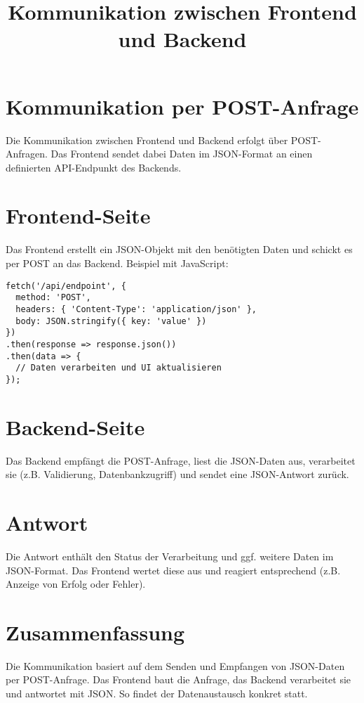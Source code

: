 \documentclass{article}
\title{Kommunikation zwischen Frontend und Backend}
\author{}
\date{}
\begin{document}
\maketitle

\section*{Kommunikation per POST-Anfrage}

Die Kommunikation zwischen Frontend und Backend erfolgt über POST-Anfragen. Das Frontend sendet dabei Daten im JSON-Format an einen definierten API-Endpunkt des Backends.

\section*{Frontend-Seite}

Das Frontend erstellt ein JSON-Objekt mit den benötigten Daten und schickt es per POST an das Backend. Beispiel mit JavaScript:

\begin{verbatim}
fetch('/api/endpoint', {
  method: 'POST',
  headers: { 'Content-Type': 'application/json' },
  body: JSON.stringify({ key: 'value' })
})
.then(response => response.json())
.then(data => {
  // Daten verarbeiten und UI aktualisieren
});
\end{verbatim}

\section*{Backend-Seite}

Das Backend empfängt die POST-Anfrage, liest die JSON-Daten aus, verarbeitet sie (z.B. Validierung, Datenbankzugriff) und sendet eine JSON-Antwort zurück.

\section*{Antwort}

Die Antwort enthält den Status der Verarbeitung und ggf. weitere Daten im JSON-Format. Das Frontend wertet diese aus und reagiert entsprechend (z.B. Anzeige von Erfolg oder Fehler).

\section*{Zusammenfassung}

Die Kommunikation basiert auf dem Senden und Empfangen von JSON-Daten per POST-Anfrage. Das Frontend baut die Anfrage, das Backend verarbeitet sie und antwortet mit JSON. So findet der Datenaustausch konkret statt.
\end{document}
